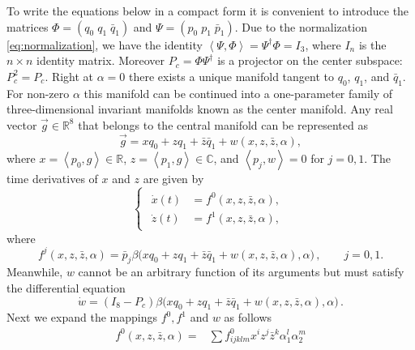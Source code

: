 \begin{subappendices}
To write the equations below in a compact form it is
convenient to introduce the matrices $\Phi = \left( q_0\; q_1\; \bar q_1
\right)$ and $\Psi = \left( p_0\; p_1\; \bar p_1 \right )$. Due to
the normalization \cref{eq:normalization}, we have the identity $\left< \Psi,
\Phi \right> = \Psi^\dagger \Phi = I_3$, where $I_n$ is the $n\times n$ identity matrix. Moreover $P_c = \Phi \Psi^\dagger$ is a projector on the center subspace: $P_c^2=P_c$. Right at $\alpha = 0$ there exists a unique manifold tangent to $q_0$, $q_1$, and $\bar q_1$. For non-zero $\alpha$ this manifold can be continued into a one-parameter family of three-dimensional invariant manifolds known as the center manifold. Any real vector $\vec{g}\in\mathbb R^8$ that belongs to the central manifold can be represented as
\begin{equation}
    \vec{g} = x q_0 + z q_1 + \bar z \bar q_1 + w(x,z,\bar{z},\alpha\textbf{}),
\end{equation}
where $x=\left< p_0, g \right>\in\mathbb R$,
$z=\left< p_1, g \right>\in\mathbb C$, and $\left< p_j, w \right> = 0$ for $j=0,1$. The time derivatives of $x$ and $z$ are given by
\begin{equation} \label{eq:reducedsystem_complex_form}
    \begin{cases} 
    \begin{aligned}
        \dot x(t) &{}= f^0(x,z,\bar z, \alpha), \\
        \dot z(t) &{}= %
        f^1(x,z,\bar z, \alpha),
    \end{aligned}  
    \end{cases} 
\end{equation}
where 
\begin{equation} \label{eq:gj}
f^j(x,z,\bar z, \alpha) = \bar p_j \beta\textbf{}\Big(x q_0 + z q_1 + \bar{z} \bar{q}_1 + w(x,z,\bar z, \alpha) , \alpha\Big)\,, \qquad j=0,1.
\end{equation}
Meanwhile, $w$ cannot be an arbitrary function of its arguments but must satisfy the differential equation
\begin{equation} \label{eq:wdot}
    \dot w = %
    \left( I_8 -  P_c \right)\beta\Big(x q_0 + z q_1 + \bar{z}\bar{q}_1 + w(x,z,\bar z, \alpha) , \alpha\Big)\,.
\end{equation}
Next we expand the mappings $f^0, f^1$ and $w$ as follows
\begin{equation}
\begin{aligned}
f^0(x,z,\bar z, \alpha) 
=& \sum f^0_{ijklm} x^i z^j \bar{z}^k    \alpha_1^l \alpha_2^m   \\

\end{aligned}
\end{equation}
\end{subappendices}

